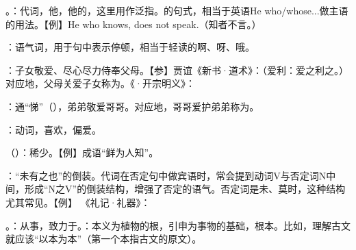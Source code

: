 {
\item {}。：代词，他，他的，这里用作泛指。的句式，相当于英语He who/whose...做主语的用法。【例】He who knows, does not speak.（知者不言。）

：语气词，用于句中表示停顿，相当于轻读的啊、呀、哦。

：子女敬爱、尽心尽力侍奉父母。【参】贾谊《新书·道术》：（爱利：爱之利之。）对应地，父母关爱子女称为。《·开宗明义》：

：通“悌”（），弟弟敬爱哥哥。对应地，哥哥爱护弟弟称为。

：动词，喜欢，偏爱。

\item {}（）：稀少。【例】成语“鲜为人知”。

\item {}：“未有之也”的倒装。代词在否定句中做宾语时，常会提到动词V与否定词N中间，形成“N之V”的倒装结构，增强了否定的语气。否定词是未、莫时，这种结构尤其常见。【例】   《礼记·礼器》：
\item {}。：从事，致力于。：本义为植物的根，引申为事物的基础，根本。比如，理解古文就应该“以本为本”（第一个本指古文的原文）。

}
